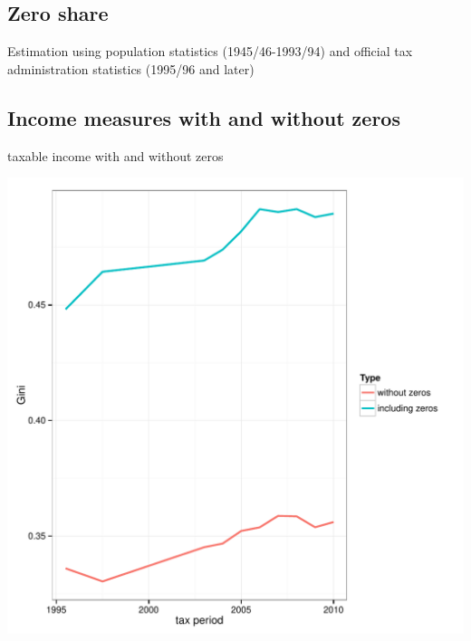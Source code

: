 \documentclass[twoside]{article}\usepackage[]{graphicx}\usepackage[]{color}
\makeatletter
\def\maxwidth{ %
  \ifdim\Gin@nat@width>\linewidth
    \linewidth
  \else
    \Gin@nat@width
  \fi
}
\newenvironment{knitrout}{}{} %
\makeatother
\begin{document}
\begin{multicols}{2}
\begin{knitrout}
\end{knitrout}


\subsection{Zero share}

Estimation using population statistics (1945/46-1993/94) and official tax administration statistics (1995/96 and later) 


\subsection{Income measures with and without zeros}

taxable income with and without zeros

\begin{knitrout}
\color{fgcolor}
\includegraphics[width=\maxwidth]{figure/with_without_zeros1} 


\end{knitrout}
\end{multicols}
\end{document}

